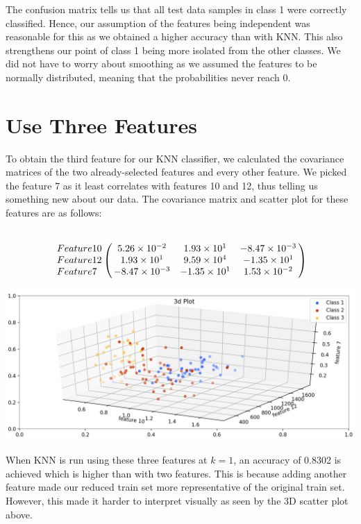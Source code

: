 \documentclass[11pt]{article}
\begin{document}
The confusion matrix tells us that all test data samples in class 1 were correctly classified. Hence, our assumption of the features being independent was reasonable for this as we obtained a higher accuracy than with KNN. This also strengthens our point of class 1 being more isolated from the other classes. We did not have to worry about smoothing as we assumed the features to be normally distributed, meaning that the probabilities never reach 0.

\section{Use Three Features}
To obtain the third feature for our KNN classifier, we calculated the covariance matrices of the two already-selected features and every other feature. We picked the feature 7 as it least correlates with features 10 and 12, thus telling us something new about our data. The covariance matrix and scatter plot for these features are as follows:

$$
\bordermatrix{ ~ & ~ & ~ & ~ \cr
Feature 10 & 5.26\times10^{-2} & 1.93\times10^1 & -8.47\times10^{-3} \cr
Feature 12 & 1.93\times10^1 & 9.59\times10^4 & -1.35\times10^1 \cr
Feature 7 & -8.47\times10^{-3} & -1.35\times10^1 & 1.53\times10^{-2} \cr}
$$

\begin{center}
\includegraphics[scale=0.3]{3d_plot_2}
\end{center}

When KNN is run using these three features at $k = 1$, an accuracy of 0.8302 is achieved which is higher than with two features. This is because adding another feature made our reduced train set more representative of the original train set. However, this made it harder to interpret visually as seen by the 3D scatter plot above.
\end{document}
